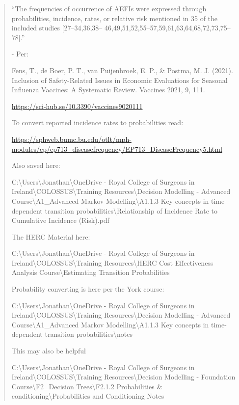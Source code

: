 \documentclass[
]{article}
\begin{document}
\begin{quote}
``The frequencies of occurrence of AEFIs were expressed through
probabilities, incidence, rates, or relative risk mentioned in 35 of the
included studies {[}27--34,36,38--
46,49,51,52,55--57,59,61,63,64,68,72,73,75--78{]}.''

- Per:

Fens, T., de Boer, P. T., van Puijenbroek, E. P., \& Postma, M. J.
(2021). Inclusion of Safety-Related Issues in Economic Evaluations for
Seasonal Influenza Vaccines: A Systematic Review. Vaccines 2021, 9, 111.

\url{https://sci-hub.se/10.3390/vaccines9020111}

To convert reported incidence rates to probabilities read:

\url{https://sphweb.bumc.bu.edu/otlt/mph-modules/ep/ep713_diseasefrequency/EP713_DiseaseFrequency5.html}

Also saved here:

C:\textbackslash Users\textbackslash Jonathan\textbackslash OneDrive -
Royal College of Surgeons in
Ireland\textbackslash COLOSSUS\textbackslash Training
Resources\textbackslash Decision Modelling - Advanced
Course\textbackslash A1\_Advanced Markov Modelling\textbackslash A1.1.3
Key concepts in time-dependent transition
probabilities\textbackslash Relationship of Incidence Rate to Cumulative
Incidence (Risk).pdf

The HERC Material here:

C:\textbackslash Users\textbackslash Jonathan\textbackslash OneDrive -
Royal College of Surgeons in
Ireland\textbackslash COLOSSUS\textbackslash Training
Resources\textbackslash HERC Cost Effectiveness Analysis
Course\textbackslash Estimating Transition Probabilities

Probability converting is here per the York course:

C:\textbackslash Users\textbackslash Jonathan\textbackslash OneDrive -
Royal College of Surgeons in
Ireland\textbackslash COLOSSUS\textbackslash Training
Resources\textbackslash Decision Modelling - Advanced
Course\textbackslash A1\_Advanced Markov Modelling\textbackslash A1.1.3
Key concepts in time-dependent transition
probabilities\textbackslash notes

This may also be helpful

C:\textbackslash Users\textbackslash Jonathan\textbackslash OneDrive -
Royal College of Surgeons in
Ireland\textbackslash COLOSSUS\textbackslash Training
Resources\textbackslash Decision Modelling - Foundation
Course\textbackslash F2\_Decision Trees\textbackslash F2.1.2
Probabilities \& conditioning\textbackslash Probabilities and
Conditioning Notes
\end{quote}
\end{document}
